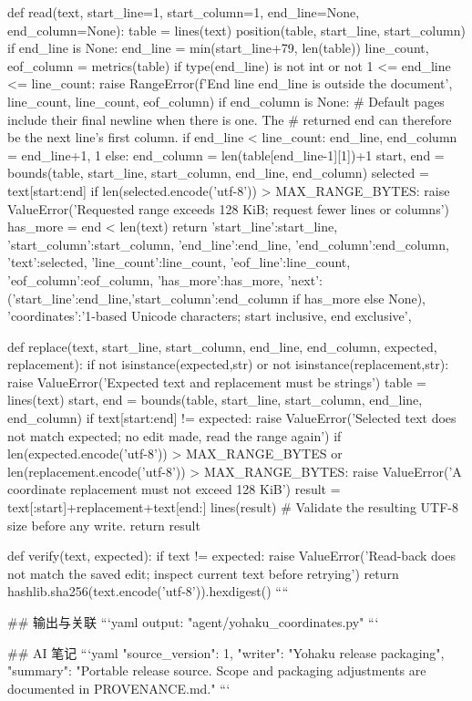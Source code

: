 def read(text, start_line=1, start_column=1, end_line=None, end_column=None):
    table = lines(text)
    position(table, start_line, start_column)
    if end_line is None:
        end_line = min(start_line+79, len(table))
    line_count, eof_column = metrics(table)
    if type(end_line) is not int or not 1 <= end_line <= line_count:
        raise RangeError(f'End line {end_line} is outside the document',
                         line_count, line_count, eof_column)
    if end_column is None:
        # Default pages include their final newline when there is one. The
        # returned end can therefore be the next line's first column.
        if end_line < line_count:
            end_line, end_column = end_line+1, 1
        else:
            end_column = len(table[end_line-1][1])+1
    start, end = bounds(table, start_line, start_column, end_line, end_column)
    selected = text[start:end]
    if len(selected.encode('utf-8')) > MAX_RANGE_BYTES:
        raise ValueError('Requested range exceeds 128 KiB; request fewer lines or columns')
    has_more = end < len(text)
    return {
        'start_line':start_line, 'start_column':start_column,
        'end_line':end_line, 'end_column':end_column, 'text':selected,
        'line_count':line_count, 'eof_line':line_count,
        'eof_column':eof_column, 'has_more':has_more,
        'next':({'start_line':end_line,'start_column':end_column} if has_more else None),
        'coordinates':'1-based Unicode characters; start inclusive, end exclusive',
    }


def replace(text, start_line, start_column, end_line, end_column, expected, replacement):
    if not isinstance(expected,str) or not isinstance(replacement,str):
        raise ValueError('Expected text and replacement must be strings')
    table = lines(text)
    start, end = bounds(table, start_line, start_column, end_line, end_column)
    if text[start:end] != expected:
        raise ValueError('Selected text does not match expected; no edit made, read the range again')
    if len(expected.encode('utf-8')) > MAX_RANGE_BYTES or len(replacement.encode('utf-8')) > MAX_RANGE_BYTES:
        raise ValueError('A coordinate replacement must not exceed 128 KiB')
    result = text[:start]+replacement+text[end:]
    lines(result)  # Validate the resulting UTF-8 size before any write.
    return result


def verify(text, expected):
    if text != expected:
        raise ValueError('Read-back does not match the saved edit; inspect current text before retrying')
    return hashlib.sha256(text.encode('utf-8')).hexdigest()
````

## 输出与关联
```yaml
output: "agent/yohaku_coordinates.py"
```

## AI 笔记
```yaml
{"source_version": 1, "writer": "Yohaku release packaging", "summary": "Portable release source. Scope and packaging adjustments are documented in PROVENANCE.md."}
```
